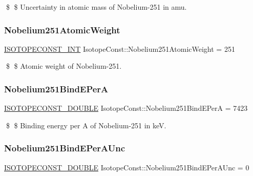\$ \$ Uncertainty in atomic mass of Nobelium-\/251 in amu. \mbox{\label{group___isotope_const-_nobelium-_no251_ga77289ed06fbec93d185dd6974badbd20}} 
\subsubsection{\texorpdfstring{Nobelium251\+Atomic\+Weight}{Nobelium251AtomicWeight}}
{\footnotesize\ttfamily \mbox{\hyperlink{group___isotope_const-_macros_ga5f18360b3e99483a35c32d789e62621c}{I\+S\+O\+T\+O\+P\+E\+C\+O\+N\+S\+T\+\_\+\+I\+NT}} Isotope\+Const\+::\+Nobelium251\+Atomic\+Weight = 251}

\$ \$ Atomic weight of Nobelium-\/251. \mbox{\label{group___isotope_const-_nobelium-_no251_gab83c657e6d9fcdad4378d5e64ef9305b}} 
\subsubsection{\texorpdfstring{Nobelium251\+Bind\+E\+PerA}{Nobelium251BindEPerA}}
{\footnotesize\ttfamily \mbox{\hyperlink{group___isotope_const-_macros_ga8f45a7272ce02c0b4c65c44636ed719a}{I\+S\+O\+T\+O\+P\+E\+C\+O\+N\+S\+T\+\_\+\+D\+O\+U\+B\+LE}} Isotope\+Const\+::\+Nobelium251\+Bind\+E\+PerA = 7423}

\$ \$ Binding energy per A of Nobelium-\/251 in keV. \mbox{\label{group___isotope_const-_nobelium-_no251_gae0d14e53c6e21a21608e7980583fc9be}} 
\subsubsection{\texorpdfstring{Nobelium251\+Bind\+E\+Per\+A\+Unc}{Nobelium251BindEPerAUnc}}
{\footnotesize\ttfamily \mbox{\hyperlink{group___isotope_const-_macros_ga8f45a7272ce02c0b4c65c44636ed719a}{I\+S\+O\+T\+O\+P\+E\+C\+O\+N\+S\+T\+\_\+\+D\+O\+U\+B\+LE}} Isotope\+Const\+::\+Nobelium251\+Bind\+E\+Per\+A\+Unc = 0}

